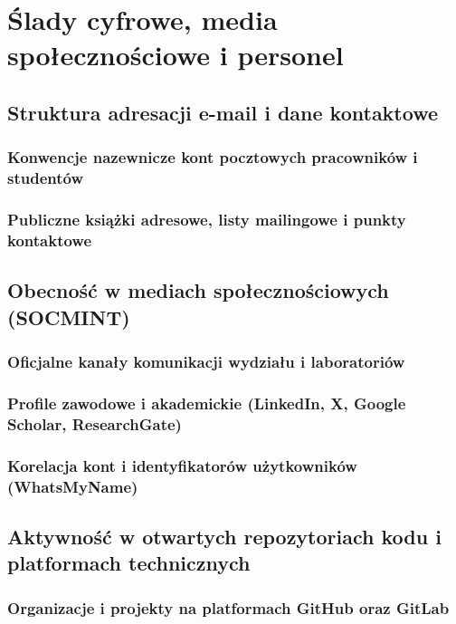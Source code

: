 \chapter{Ślady cyfrowe, media społecznościowe i personel}\label{ch:slady-cyfrowe}

\section{Struktura adresacji e-mail i dane kontaktowe}\label{sec:adresy-email}
\subsection{Konwencje nazewnicze kont pocztowych pracowników i studentów}\label{subsec:konwencje-email}
\subsection{Publiczne książki adresowe, listy mailingowe i punkty kontaktowe}\label{subsec:ksiazki-adresowe}

\section{Obecność w mediach społecznościowych (SOCMINT)}\label{sec:socmint}
\subsection{Oficjalne kanały komunikacji wydziału i laboratoriów}\label{subsec:oficjalne-kanaly}
\subsection{Profile zawodowe i akademickie (LinkedIn, X, Google Scholar, ResearchGate)}\label{subsec:profile-zawodowe}
\subsection{Korelacja kont i identyfikatorów użytkowników (WhatsMyName)}\label{subsec:whatsmyname}

\section{Aktywność w otwartych repozytoriach kodu i platformach technicznych}\label{sec:repozytoria}
\subsection{Organizacje i projekty na platformach GitHub oraz GitLab}\label{subsec:github-gitlab}
